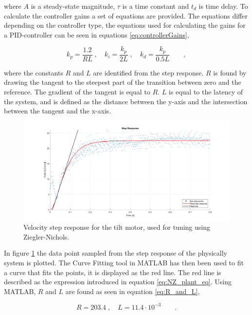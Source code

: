 \documentclass[../../main.tex]{subfiles}
\begin{document}
where $A$ is a steady-state magnitude, $\tau$ is a time constant and $t_{d}$ is time delay.
To calculate the controller gains a set of equations are provided. The equations differ depending on the controller type, the equations used for calculating the gains for a PID-controller can be seen in equations \ref{eq:controllerGains},

\begin{equation}
k_p = \frac{1.2}{RL}\;, \quad k_i = \frac{k_p}{2L}\;, \quad k_d = \frac{k_p}{0.5L} \qquad ,
\label{eq:controllerGains}
\end{equation}

where the constants $R$ and $L$ are identified from the step response. $R$ is found by drawing the tangent to the steepest part of the transition between zero and the reference. The gradient of the tangent is equal to $R$. $L$ is equal to the latency of the system, and is defined as the distance between the y-axis and the intersection between the tangent and the x-axis. 



\begin{figure}
    \centering
    \includegraphics[width = 1\textwidth]{Sections/System_Design/Images/Ziegler-Nichols_Stepresponse.png}
    \caption{Velocity step response for the tilt motor, used for tuning using Ziegler-Nichols.}
    \label{fig:stepPlantNZ}
\end{figure}

In figure \ref{fig:stepPlantNZ} the data point sampled from the step response of the physically  system is plotted. The Curve Fitting tool in MATLAB has then been used to fit a curve that fits the points, it is displayed as the red line. The red line is described as the expression introduced in equation \ref{eq:NZ_plant_eq}. Using MATLAB, $R$ and $L$ are found as seen in equation \ref{eq:R_and_L},

\begin{equation}
    R = 203.4 \;, \quad L = 11.4 \cdot 10^{-3} \qquad .
    \label{eq:R_and_L}
\end{equation}
\end{document}
